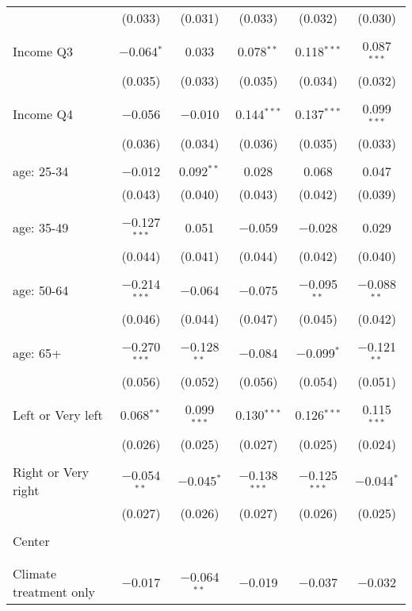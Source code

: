 \begin{tabular}{@{\extracolsep{5pt}}lccccc}
  & (0.033) & (0.031) & (0.033) & (0.032) & (0.030) \\ 
  & & & & & \\ 
 Income Q3 & $-$0.064$^{*}$ & 0.033 & 0.078$^{**}$ & 0.118$^{***}$ & 0.087$^{***}$ \\ 
  & (0.035) & (0.033) & (0.035) & (0.034) & (0.032) \\ 
  & & & & & \\ 
 Income Q4 & $-$0.056 & $-$0.010 & 0.144$^{***}$ & 0.137$^{***}$ & 0.099$^{***}$ \\ 
  & (0.036) & (0.034) & (0.036) & (0.035) & (0.033) \\ 
  & & & & & \\ 
 age: 25-34 & $-$0.012 & 0.092$^{**}$ & 0.028 & 0.068 & 0.047 \\ 
  & (0.043) & (0.040) & (0.043) & (0.042) & (0.039) \\ 
  & & & & & \\ 
 age: 35-49 & $-$0.127$^{***}$ & 0.051 & $-$0.059 & $-$0.028 & 0.029 \\ 
  & (0.044) & (0.041) & (0.044) & (0.042) & (0.040) \\ 
  & & & & & \\ 
 age: 50-64 & $-$0.214$^{***}$ & $-$0.064 & $-$0.075 & $-$0.095$^{**}$ & $-$0.088$^{**}$ \\ 
  & (0.046) & (0.044) & (0.047) & (0.045) & (0.042) \\ 
  & & & & & \\ 
 age: 65+ & $-$0.270$^{***}$ & $-$0.128$^{**}$ & $-$0.084 & $-$0.099$^{*}$ & $-$0.121$^{**}$ \\ 
  & (0.056) & (0.052) & (0.056) & (0.054) & (0.051) \\ 
  & & & & & \\ 
 Left or Very left & 0.068$^{**}$ & 0.099$^{***}$ & 0.130$^{***}$ & 0.126$^{***}$ & 0.115$^{***}$ \\ 
  & (0.026) & (0.025) & (0.027) & (0.025) & (0.024) \\ 
  & & & & & \\ 
 Right or Very right & $-$0.054$^{**}$ & $-$0.045$^{*}$ & $-$0.138$^{***}$ & $-$0.125$^{***}$ & $-$0.044$^{*}$ \\ 
  & (0.027) & (0.026) & (0.027) & (0.026) & (0.025) \\ 
  & & & & & \\ 
 Center &  &  &  &  &  \\ 
  &  &  &  &  &  \\ 
  & & & & & \\ 
 Climate treatment only & $-$0.017 & $-$0.064$^{**}$ & $-$0.019 & $-$0.037 & $-$0.032 \\ 

\end{tabular}
